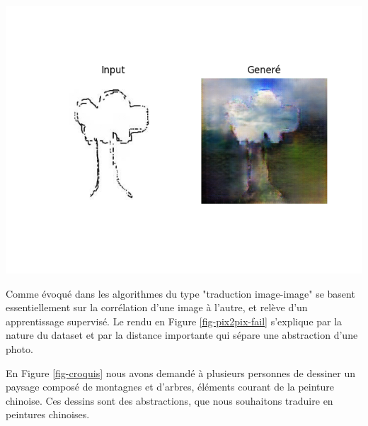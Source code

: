 \documentclass[a4paper, 12pt]{report}
\begin{document}
\begin{center}
\includegraphics[width=0.7\linewidth]{images/pix2pix-fail.png}
\label{fig-pix2pix-fail}
\end{center}

Comme évoqué dans \cite{DBLP:journals/corr/abs-1805-00247} les algorithmes du type "traduction image-image" se basent essentiellement sur la corrélation d'une image à l'autre, et relève d'un apprentissage supervisé. Le rendu en Figure \ref{fig-pix2pix-fail} s'explique par la nature du dataset et par la distance importante qui sépare une abstraction d'une photo. 

En Figure \ref{fig-croquis} nous avons demandé à plusieurs personnes de dessiner un paysage composé de montagnes et d'arbres, éléments courant de la peinture chinoise. Ces dessins sont des abstractions, que nous souhaitons traduire en peintures chinoises.
\end{document}
